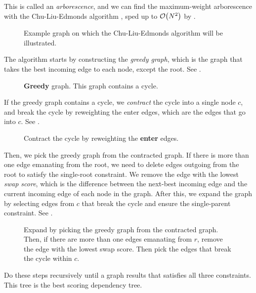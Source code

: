 This is called an \textit{arborescence}, and
we can find the maximum-weight arborescence with the Chu-Liu-Edmonds algorithm
\citep{chu1965shortest,edmonds1967optimum}, sped up to $\bigo{N^2}$ by
\citet{tarjan1977finding}.

\begin{figure}[h!]
    \centering
    \caption{Example graph on which the Chu-Liu-Edmonds algorithm will be
    illustrated.}
    \label{fig:clu}
\end{figure}

The algorithm starts by constructing the \textit{greedy graph}, which is the
graph that takes the best incoming edge to each node, except the root. See
.

\begin{figure}[h!]
    \centering
    \caption{\textbf{Greedy} graph. This graph contains a cycle.}
    \label{fig:clu-greedy}
\end{figure}

If the greedy graph contains a cycle, we \textit{contract} the cycle into a
single node $c$, and break the cycle by reweighting the enter edges, which are
the edges that go into $c$. See .

\begin{figure}[h!]
    \centering
    \caption{Contract the cycle by reweighting the \textbf{enter} edges.}
    \label{fig:clu-contract}
\end{figure}

Then, we pick the greedy graph from the contracted graph. If there is more than
one edge emanating from the root, we need to delete edges outgoing from the root
to satisfy the single-root constraint. We remove the edge with the lowest
\textit{swap score}, which is the difference between the next-best incoming edge
and the current incoming edge of each node in the graph. After this, we expand
the graph by selecting edges from $c$ that break the cycle and ensure the
single-parent constraint. See .

\begin{figure}[h!]
    \centering
    \caption{Expand by picking the greedy graph from the contracted graph. Then,
    if there are more than one edges emanating from $r$, remove the edge with
    the lowest swap score. Then pick the edges that break the cycle within $c$.}
    \label{fig:clu-expand}
\end{figure}

Do these steps recursively until a graph results that satisfies all three
constraints. This tree is the best scoring dependency tree.
